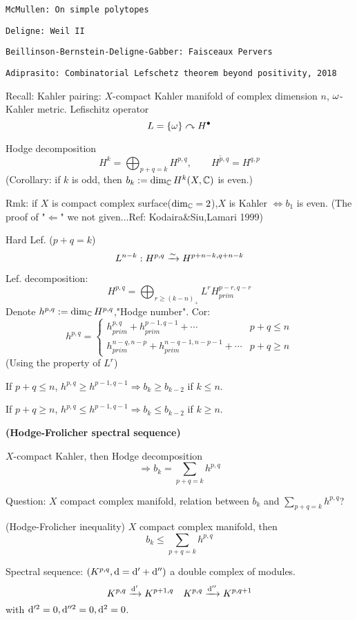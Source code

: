 \verb"McMullen: On simple polytopes"

\verb"Deligne: Weil II"

\verb"Beillinson-Bernstein-Deligne-Gabber: Faisceaux Pervers"

\verb"Adiprasito: Combinatorial Lefschetz theorem beyond positivity, 2018"



Recall: Kahler pairing:
$X$-compact Kahler manifold of complex dimension $n$, $\omega$-Kahler metric.
Lefischitz operator
$$L=\{\omega\}\curvearrowright H^{\bullet}$$

Hodge decomposition
$$H^k=\bigoplus_{p+q=k}H^{p,q},\qquad \overline{H^{p,q}}=H^{q,p}$$
(Corollary: if $k$ is odd, then $b_k:=\dim_{\mathbb{C}}H^k(X,\mathbb{C})$ is even.)

Rmk: if $X$ is compact complex surface($\dim_{\mathbb{C}}=2$),$X$ is Kahler $\iff b_1$ is even.
(The proof of "$\Leftarrow$" we not given...Ref: Kodaira\&Siu,Lamari 1999)

Hard Lef. ($p+q=k$)
$$L^{n-k}:H^{p,q}\xrightarrow{\sim}H^{p+n-k,q+n-k}$$

Lef. decomposition:
$$H^{p,q}=\bigoplus_{r\geq (k-n)_+} L^rH_{prim}^{p-r,q-r}$$
Denote $h^{p,q}:=\dim_{\mathbb{C}}H^{p,q}$,"Hodge number".
Cor:
$$
  h^{p,q}=
  \left\{
    \begin{array}{lc}
      h_{prim}^{p,q}+h_{prim}^{p-1,q-1}+\cdots & p+q\leq n\\
      h_{prim}^{n-q,n-p}
       +h_{prim}^{n-q-1,n-p-1}+\cdots & p+q\geq n
    \end{array}
  \right.
$$
(Using the property of $L^r$)

If $p+q\leq n$, $h^{p,q}\geq h^{p-1,q-1}\Rightarrow
b_k\geq b_{k-2}$ if $k\leq n$.

If $p+q\geq n$, $h^{p,q}\leq h^{p-1,q-1}\Rightarrow b_k\leq b_{k-2}$
if $k\geq n$.

\textbf{(Hodge-Frolicher spectral sequence)}

$X$-compact Kahler, then Hodge decomposition
$$\Rightarrow b_k=\sum_{p+q=k}h^{p,q}$$

Question: $X$ compact complex manifold, relation between
$b_k$ and $\sum\limits_{p+q=k}h^{p,q}$?

\begin{thm}(Hodge-Frolicher inequality)
$X$ compact complex manifold, then
$$b_k\leq\sum_{p+q=k} h^{p,q}$$
\end{thm}

Spectral sequence:
$(K^{p,q},\mathrm{d}=\mathrm{d}'+\mathrm{d}'')$ a double complex of modules.
$$K^{p,q}\xrightarrow{\mathrm{d}'}K^{p+1,q}\quad
K^{p,q}\xrightarrow{\mathrm{d}''}K^{p,q+1}$$
with $\mathrm{d}'^2=0,\mathrm{d}''^2=0,\mathrm{d}^2=0$.

